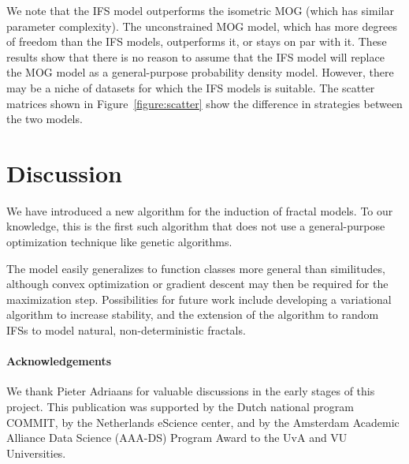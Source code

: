 \documentclass[reprint,amsmath,amssymb,aps,prl]{revtex4-1}
\begin{document}

We note that the IFS model outperforms the isometric MOG (which has similar parameter complexity). The unconstrained MOG model, which has more degrees of freedom than the IFS models, outperforms it, or stays on par with it. These results show that there is no reason to assume that the IFS model will replace the MOG model as a general-purpose probability density model. However, there may be a niche of datasets for which the IFS models is suitable. The scatter matrices shown in Figure~\ref{figure:scatter} show the difference in strategies between the two models.

\section{Discussion}
\label{section:discussion}

We have introduced a new algorithm for the induction of fractal models. To our knowledge, this is the first such algorithm that does not use a general-purpose optimization technique like genetic algorithms. 

The model easily generalizes to function classes more general than similitudes, although convex optimization or gradient descent may then be required for the maximization step. Possibilities for future work include developing a variational algorithm \cite{beal2003variational} to increase stability, and the extension of the algorithm to random IFSs \cite{hart1996fractal} to model natural, non-deterministic fractals.

\paragraph{Acknowledgements} We thank Pieter Adriaans for valuable discussions in the early stages of this project. This publication was supported by the Dutch national program COMMIT, by the Netherlands eScience center, and by the Amsterdam Academic Alliance Data Science (AAA-DS) Program Award to the UvA and VU Universities.


\end{document}
